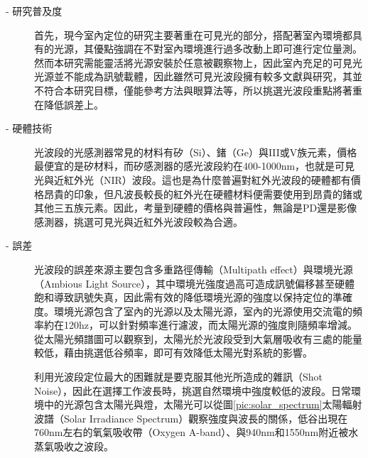         \begin{description}
        \item[- 研究普及度]\hfill 

        首先，現今室內定位的研究主要著重在可見光的部分\cite{survey_light2018}，搭配著室內環境都具有的光源，其優點強調在不對室內環境進行過多改動上即可進行定位量測。然而本研究需能靈活將光源安裝於任意被觀察物上，因此室內充足的可見光光源並不能成為訊號載體，因此雖然可見光波段擁有較多文獻與研究，其並不符合本研究目標，僅能參考方法與眼算法等，所以挑選光波段重點將著重在降低誤差上。

        \item[- 硬體技術] \hfill 
        
        光波段的光感測器常見的材料有矽（Si）、鍺（Ge）與III或V族元素，價格最便宜的是矽材料，而矽感測器的感光波段約在400-1000nm，也就是可見光與近紅外光（NIR）波段。這也是為什麼普遍對紅外光波段的硬體都有價格昂貴的印象，但凡波長較長的紅外光在硬體材料便需要使用到昂貴的鍺或其他三五族元素\cite{si_pd}。因此，考量到硬體的價格與普遍性，無論是PD還是影像感測器，挑選可見光與近紅外光波段較為合適。


        \item[- 誤差] \hfill 
        

        光波段的誤差來源主要包含多重路徑傳輸（Multipath effect）與環境光源（Ambious Light Source）\cite{survey_light2020}，其中環境光強度過高可造成訊號偏移甚至硬體飽和導致訊號失真，因此需有效的降低環境光源的強度以保持定位的準確度。環境光源包含了室內的光源以及太陽光源，室內的光源使用交流電的頻率約在120hz，可以針對頻率進行濾波，而太陽光源的強度則隨頻率增減。從太陽光頻譜圖可以觀察到，太陽光於光波段受到大氣層吸收有三處的能量較低，藉由挑選低谷頻率，即可有效降低太陽光對系統的影響。

        利用光波段定位最大的困難就是要克服其他光所造成的雜訊（Shot Noise），因此在選擇工作波長時，挑選自然環境中強度較低的波段。日常環境中的光源包含太陽光與燈，太陽光可以從圖\ref{pic:solar_spectrum}太陽輻射波譜（Solar Irradiance Spectrum）觀察強度與波長的關係，低谷出現在760nm左右的氧氣吸收帶（Oxygen A-band）、與940nm和1550nm附近被水蒸氣吸收之波段\cite{book:solar_spectrum}。


\end{description}
